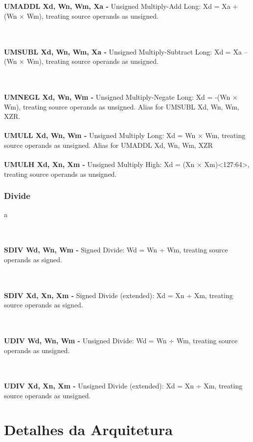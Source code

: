 \documentclass[12pt,a4paper,utf8]{ppgsi}
\begin{document}
\\\\\textbf{UMADDL Xd, Wn, Wm, Xa -} Unsigned Multiply-Add Long: Xd = Xa + (Wn × Wm), treating source operands as unsigned. 

\\\\\textbf{UMSUBL Xd, Wn, Wm, Xa -} Unsigned Multiply-Subtract Long: Xd = Xa – (Wn × Wm), treating source operands as unsigned. 

\\\\\textbf{UMNEGL Xd, Wn, Wm -} Unsigned Multiply-Negate Long: Xd = -(Wn × Wm), treating source operands as unsigned.
Alias for UMSUBL Xd, Wn, Wm, XZR.
\\\\\textbf{UMULL Xd, Wn, Wm -} Unsigned Multiply Long: Xd = Wn × Wm, treating source operands as unsigned.
Alias for UMADDL Xd, Wn, Wm, XZR
\\\\\textbf{UMULH Xd, Xn, Xm -} Unsigned Multiply High: Xd = (Xn × Xm)<127:64>, treating source operands as unsigned. 


\subsubsection{Divide}
a

\\\\\textbf{SDIV Wd, Wn, Wm -} Signed Divide: Wd = Wn ÷ Wm, treating source operands as signed. 

\\\\\textbf{SDIV Xd, Xn, Xm -} Signed Divide (extended): Xd = Xn ÷ Xm, treating source operands as signed. 

\\\\\textbf{UDIV Wd, Wn, Wm -} Unsigned Divide: Wd = Wn ÷ Wm, treating source operands as unsigned. 

\\\\\textbf{UDIV Xd, Xn, Xm -} Unsigned Divide (extended): Xd = Xn ÷ Xm, treating source operands as unsigned. 

\section{Detalhes da Arquitetura}
\end{document}
